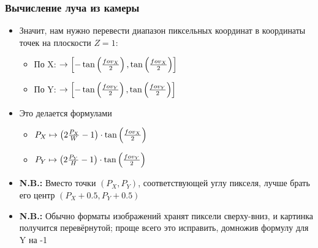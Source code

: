 \documentclass[10pt,handout]{beamer}
\begin{document}
\begin{frame}
\frametitle{Вычисление луча из камеры}
\begin{itemize}
\item Значит, нам нужно перевести диапазон пиксельных координат в координаты точек на плоскости \begin{math}Z=1\end{math}:
\begin{itemize}
\item По X: \begin{math}[0, W]\rightarrow\left[-\tan\left({fov_X\over 2}\right), \tan\left({fov_X\over 2}\right)\right]\end{math}
\item По Y: \begin{math}[0, H]\rightarrow\left[-\tan\left({fov_Y\over 2}\right), \tan\left({fov_Y\over 2}\right)\right]\end{math}
\end{itemize}
\pause
\item Это делается формулами
\begin{itemize}
\item \begin{math}P_X \mapsto \left(2 \frac{P_X}{W} - 1\right) \cdot \tan\left({fov_X\over 2}\right)\end{math}
\item \begin{math}P_Y \mapsto \left(2 \frac{P_Y}{H} - 1\right) \cdot \tan\left({fov_Y\over 2}\right)\end{math}
\end{itemize}
\pause
\item \alert{\textbf{N.B.:}} Вместо точки \begin{math}(P_X, P_Y)\end{math}, соответствующей углу пикселя, лучше брать его центр \begin{math}(P_X + 0.5, P_Y + 0.5)\end{math}
\item \alert{\textbf{N.B.:}} Обычно форматы изображений хранят пиксели сверху-вниз, и картинка получится перевёрнутой; проще всего это исправить, домножив формулу для Y на -1
\end{itemize}
\end{frame}
\end{document}
